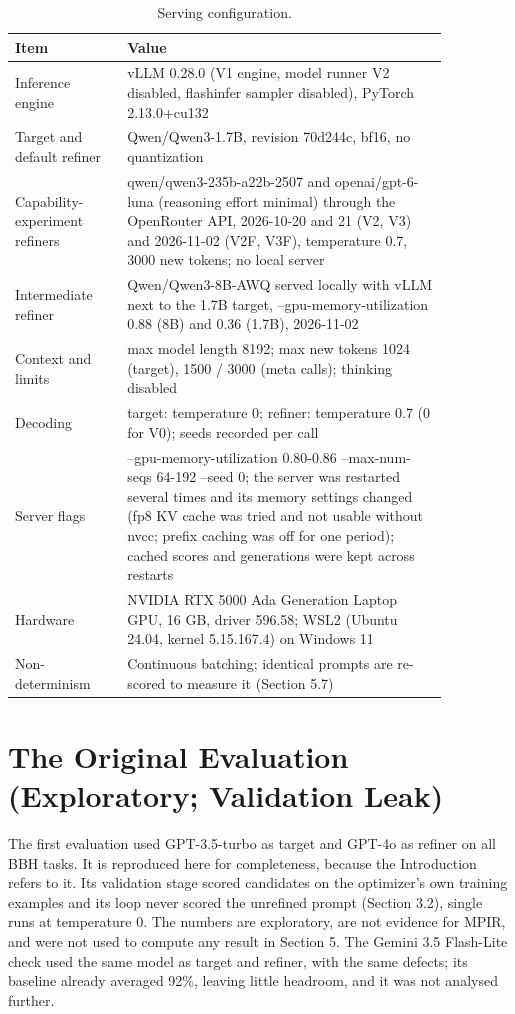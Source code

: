 \documentclass{ieeeaccess}
\begin{document}
\begin{table}[htbp]
\centering
\small
\caption{Serving configuration.}
\begin{tabular}{>{\raggedright\arraybackslash}p{0.224\linewidth}>{\raggedright\arraybackslash}p{0.636\linewidth}}
\toprule
\textbf{Item} & \textbf{Value} \\
\midrule
Inference engine & vLLM 0.28.0 (V1 engine, model runner V2 disabled, flashinfer sampler disabled), PyTorch 2.13.0+cu132 \\
Target and default refiner & Qwen/Qwen3-1.7B, revision 70d244c, bf16, no quantization \\
Capability-experiment refiners & qwen/qwen3-235b-a22b-2507 and openai/gpt-6-luna (reasoning effort minimal) through the OpenRouter API, 2026-10-20 and 21 (V2, V3) and 2026-11-02 (V2F, V3F), temperature 0.7, 3000 new tokens; no local server \\
Intermediate refiner & Qwen/Qwen3-8B-AWQ served locally with vLLM next to the 1.7B target, --gpu-memory-utilization 0.88 (8B) and 0.36 (1.7B), 2026-11-02 \\
Context and limits & max model length 8192; max new tokens 1024 (target), 1500 / 3000 (meta calls); thinking disabled \\
Decoding & target: temperature 0; refiner: temperature 0.7 (0 for V0); seeds recorded per call \\
Server flags & --gpu-memory-utilization 0.80-0.86 --max-num-seqs 64-192 --seed 0; the server was restarted several times and its memory settings changed (fp8 KV cache was tried and not usable without nvcc; prefix caching was off for one period); cached scores and generations were kept across restarts \\
Hardware & NVIDIA RTX 5000 Ada Generation Laptop GPU, 16 GB, driver 596.58; WSL2 (Ubuntu 24.04, kernel 5.15.167.4) on Windows 11 \\
Non-determinism & Continuous batching; identical prompts are re-scored to measure it (Section 5.7) \\
\bottomrule
\end{tabular}
\end{table}

\section{The Original Evaluation (Exploratory; Validation Leak)}

The first evaluation used GPT-3.5-turbo as target and GPT-4o as refiner on all BBH tasks. It is reproduced here for completeness, because the Introduction refers to it. Its validation stage scored candidates on the optimizer's own training examples and its loop never scored the unrefined prompt (Section 3.2), single runs at temperature 0. The numbers are exploratory, are not evidence for MPIR, and were not used to compute any result in Section 5. The Gemini 3.5 Flash-Lite check used the same model as target and refiner, with the same defects; its baseline already averaged 92\%, leaving little headroom, and it was not analysed further.
\end{document}
